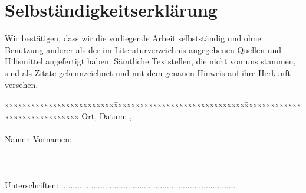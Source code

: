 \chapter*{Selbständigkeitserklärung}
\label{chap:selbstaendigkeitserklaerung}

\vspace*{10mm} 

Wir bestätigen, dass wir die vorliegende Arbeit selbstständig und ohne Benutzung anderer als der im Literaturverzeichnis angegebenen Quellen und Hilfsmittel angefertigt haben. Sämtliche Textstellen, die nicht von uns stammen, sind als Zitate gekennzeichnet und mit dem genauen Hinweis auf ihre Herkunft versehen. 

\vspace{15mm}

\begin{tabbing}
xxxxxxxxxxxxxxxxxxxxxxxxx\=xxxxxxxxxxxxxxxxxxxxxxxxxxxxxx\=xxxxxxxxxxxxxxxxxxxxxxxxxxxxxx\kill
Ort, Datum:		\> [Bern], \versiondate \\ \\ 
Namen Vornamen:	 	 \\ \\ \\ \\ 
Unterschriften:	\>......................................\>......................................\\
\end{tabbing}
